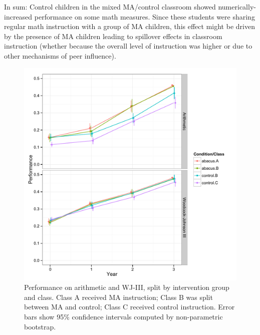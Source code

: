 \documentclass[11pt]{article}
\begin{document}
In sum: Control children in the mixed MA/control classroom showed numerically-increased performance on some math measures. Since these students were sharing regular math instruction with a group of MA children, this effect might be driven by the presence of MA children leading to spillover effects in classroom instruction (whether because the overall level of instruction was higher or due to other mechanisms of peer influence).

\begin{figure}[H]
\begin{center}
\includegraphics[width=5.5in]{figures/math1_class.pdf}
\end{center}
\caption{Performance on arithmetic and WJ-III, split by intervention group and class. Class A received MA instruction; Class B was split between MA and control; Class C received control instruction. Error bars show 95\% confidence intervals computed by non-parametric bootstrap.}
\label{fig:mathclass1}
\end{figure}
\end{document}
